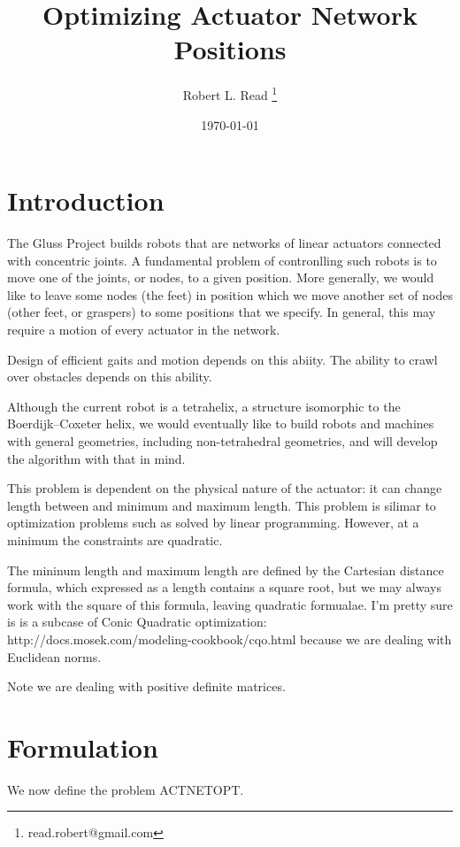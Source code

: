 \documentclass[11pt]{article}
\title{Optimizing Actuator Network Positions}
\author{Robert L. Read
  \thanks{read.robert@gmail.com}
}
\affil{Founder, Public Invention, an educational non-profit.}
\date{\today}
\begin{document}
\maketitle


\section{Introduction}

The Gluss Project builds robots that are networks of linear actuators connected with concentric joints.
A fundamental problem of contronlling such robots is to move one of the joints, or nodes, to a given
position.
More generally, we would like to leave some nodes (the feet) in position which we move another
set of nodes (other feet, or graspers) to some positions that we specify. In general, this may
require a motion of every actuator in the network.

Design of efficient gaits and motion depends on this abiity. The ability to crawl over obstacles
depends on this ability.

Although the current robot is a tetrahelix, a structure isomorphic to the Boerdijk--Coxeter
helix, we would eventually like to build robots and machines with general geometries,
including non-tetrahedral geometries, and will develop the algorithm with that in mind.

This problem is dependent on the physical nature of the actuator: it can change length
between and minimum and maximum length.
This problem is silimar to optimization problems such as solved by linear programming.
However, at a minimum the constraints are quadratic.


The mininum length and maximum length are defined by the Cartesian distance formula,
which expressed as a length contains a square root, but we may always work with the
square of this formula, leaving quadratic formualae.  I'm pretty sure is
is a subcase of Conic Quadratic optimization: http://docs.mosek.com/modeling-cookbook/cqo.html
because we are dealing with Euclidean norms.

Note we are dealing with positive definite matrices.


\section{Formulation}

We now define the problem ACTNETOPT.
\end{document}
